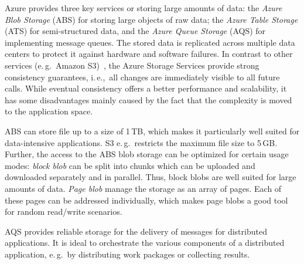\documentclass[conference,final]{IEEEtran}
\newcommand{\alnote}[1]{ {\textcolor{blue} { ***AL: #1 }}}
\newcommand{\jhanote}[1]{ {\textcolor{red} { ***SJ: #1 }}}
\newcommand{\alnote}[1]{}
\newcommand{\jhanote}[1]{}
\begin{document}
Azure provides three key services or storing large amounts of data:
the \emph{Azure Blob Storage} (ABS) for storing large objects of raw
data; the \emph{Azure Table Storage} (ATS) for semi-structured data,
and the \emph{Azure Queue Storage} (AQS) for implementing message
queues.  The stored data is %
replicated across multiple data centers to protect it against hardware
and software failures. In contrast to other services (e.\,g.\ Amazon
S3)~\cite{1294281}, the Azure Storage Services provide strong
consistency guarantees, i.\,e.,\ all changes are immediately visible to
all future calls. While eventual consistency offers a better
performance and scalability, it has some disadvantages mainly caused
by the fact that the complexity is moved to the application space.

ABS can store file up to a size of 1\,TB, which makes it particularly
well suited for data-intensive applications. S3 e.\,g.\ restricts the
maximum file size to 5\,GB. Further, the access to the ABS blob
storage can be optimized for certain usage modes: \emph{block blob}
can be split into chunks which can be uploaded and downloaded
separately and in parallel.  Thus, block blobs are well suited for
large amounts of data. \emph{Page blob} manage the storage as an array
of pages. Each of these pages can be addressed individually, which
makes page blobs a good tool for random read/write scenarios.


AQS provides reliable storage for the delivery of messages for
distributed applications.  It is ideal to orchestrate the various
components of a distributed application, e.\,g.\ by distributing work
packages or collecting results.

\end{document}
